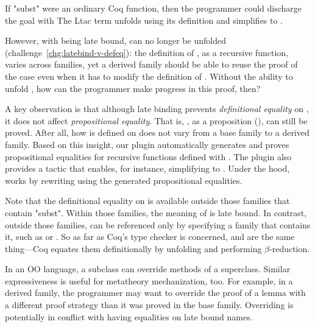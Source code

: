 \noindent
If "subst" were an ordinary Coq function, then the programmer could
discharge the goal with
The Ltac term  unfolds  using its definition
and simplifies  to .

However, with  being late bound,  can no longer
be unfolded (challenge~\ref{chg:latebind-v-defeq}):
the definition of , as a recursive function,
varies across families, yet a derived family should be able to reuse the
proof of the  case
even when it has to modify the definition of .
Without the ability to unfold ,
how can the programmer make progress in this proof, then?

A key observation is that although late binding
prevents \emph{definitional equality} on , it does not
affect \emph{propositional equality}.
That is, , as a proposition
(), can still be proved.
After all, how  is defined on  does not vary
from a base family to a derived family.
%
Based on this insight, our plugin automatically generates and proves
propositional equalities for recursive functions defined with .
The plugin also provides a tactic  that enables, for instance,
simplifying  to .
Under the hood,  works by rewriting using the generated
propositional equalities.

Note that the definitional equality on  is available
outside those families that contain "subst".
Within those families, the meaning of  is late bound.
In contrast, outside those families,  can be referenced only
by specifying a family that contains it,
such as  or .
So as far as Coq's type checker is concerned,  and
 are the same thing---Coq equates them
definitionally by unfolding  and performing
$\beta$-reduction.


In an OO language, a subclass can override methods of a superclass.
Similar expressiveness is useful for metatheory mechanization, too.
%
For example, in a derived family, the programmer may want to override
the proof of a lemma with a different proof strategy than it was proved
in the base family.
%
Overriding is potentially in conflict with having equalities on late bound names.

